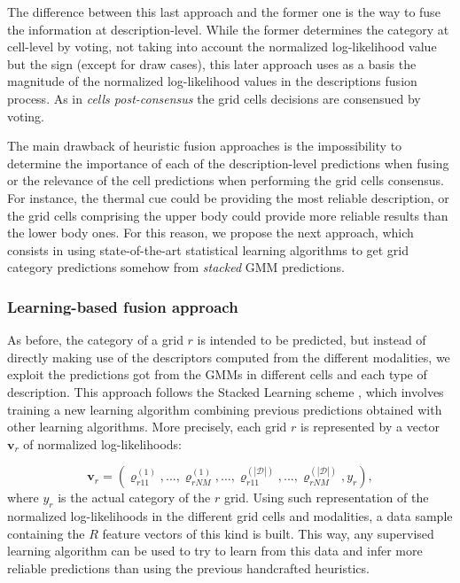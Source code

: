 \documentclass[10pt,twocolumn,letterpaper]{article}
\begin{document}
The difference between this last approach and the former one is the way to fuse the information at description-level. While the former determines the category at cell-level by voting, not taking into account the normalized log-likelihood value but the sign (except for draw cases), this later approach uses as a basis the magnitude of the normalized log-likelihood values in the descriptions fusion process. As in \textit{cells post-consensus} the grid cells decisions are consensued by voting.

The main drawback of heuristic fusion approaches is the impossibility to determine the importance of each of the description-level predictions when fusing or the relevance of the cell predictions when performing the grid cells consensus. For instance, the thermal cue could be providing the most reliable description, or the grid cells comprising the upper body could provide more reliable results than the lower body ones. For this reason, we propose the next approach, which consists in using state-of-the-art statistical learning algorithms to get grid category predictions somehow from \textit{stacked} GMM predictions.

\subsubsection{Learning-based fusion approach}

As before, the category of a grid $r$ is intended to be predicted, but instead of directly making use of the descriptors computed from the different modalities, we exploit the predictions got from the GMMs in different cells and each type of description. This approach follows the Stacked Learning scheme \cite{cohen2005stacked, puertas2013generalized}, which involves training a new learning algorithm combining previous predictions obtained with other learning algorithms. More precisely, each grid $r$ is represented by a vector $\mathbf{v}_r$ of normalized log-likelihoods:

$$\mathbf{v}_r = (\varrho_{r11}^{(1)}, ..., \varrho_{rNM}^{(1)}, ..., \varrho_{r11}^{(|\mathcal{D}|)}, ..., \varrho_{rNM}^{(|\mathcal{D}|)}, y_r) ,$$
where $y_r$ is the actual category of the $r$ grid. Using such representation of the normalized log-likelihoods in the different grid cells and modalities, a data sample containing the $R$ feature vectors of this kind is built. This way, any supervised learning algorithm can be used to try to learn from this data and infer more reliable predictions than using the previous handcrafted heuristics. 
\end{document}
